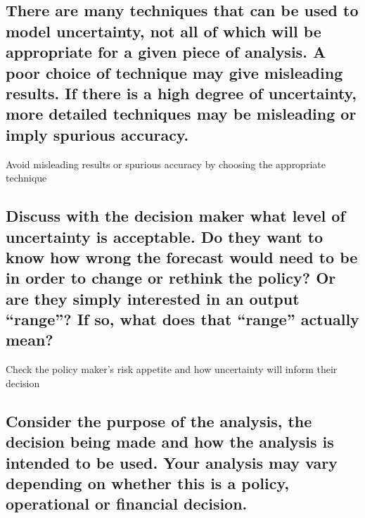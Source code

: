 \documentclass[]{book}
\begin{document}
\subsection{There are many techniques that can be used to model
uncertainty, not all of which will be appropriate for a given piece of
analysis. A poor choice of technique may give misleading results. If
there is a high degree of uncertainty, more detailed techniques may be
misleading or imply spurious
accuracy.}\label{there-are-many-techniques-that-can-be-used-to-model-uncertainty-not-all-of-which-will-be-appropriate-for-a-given-piece-of-analysis.-a-poor-choice-of-technique-may-give-misleading-results.-if-there-is-a-high-degree-of-uncertainty-more-detailed-techniques-may-be-misleading-or-imply-spurious-accuracy.}

 Avoid misleading results or spurious accuracy by choosing the
appropriate technique

\subsection{\texorpdfstring{Discuss with the decision maker what level
of uncertainty is acceptable. Do they want to know how wrong the
forecast would need to be in order to change or rethink the policy? Or
are they simply interested in an output ``range''? If so, what does that
``range'' actually mean?
}{Discuss with the decision maker what level of uncertainty is acceptable. Do they want to know how wrong the forecast would need to be in order to change or rethink the policy? Or are they simply interested in an output range? If so, what does that range actually mean?    }}\label{discuss-with-the-decision-maker-what-level-of-uncertainty-is-acceptable.-do-they-want-to-know-how-wrong-the-forecast-would-need-to-be-in-order-to-change-or-rethink-the-policy-or-are-they-simply-interested-in-an-output-range-if-so-what-does-that-range-actually-mean}

 Check the policy maker's risk appetite and how uncertainty will inform
their decision

\subsection{\texorpdfstring{Consider the purpose of the analysis, the
decision being made and how the analysis is intended to be used. Your
analysis may vary depending on whether this is a policy, operational or
financial decision.
}{Consider the purpose of the analysis, the decision being made and how the analysis is intended to be used. Your analysis may vary depending on whether this is a policy, operational or financial decision.    }}\label{consider-the-purpose-of-the-analysis-the-decision-being-made-and-how-the-analysis-is-intended-to-be-used.-your-analysis-may-vary-depending-on-whether-this-is-a-policy-operational-or-financial-decision.}
\end{document}
